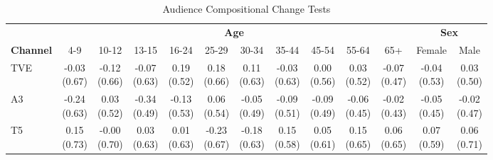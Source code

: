 \documentclass[12pt]{article}
\begin{document}
\begin{table}[!htbp]\centering
\footnotesize
\caption{Audience Compositional Change Tests}
\label{tab:compositional}
\begin{threeparttable}
	\begin{tabular}{lcccccccccc|cc}
		\toprule
		& \multicolumn{10}{c}{\textbf{Age}} & \multicolumn{2}{c}{\textbf{Sex}} \\
		\cmidrule(lr){2-11}\cmidrule(lr){12-13}
		\textbf{Channel} & 4-9 & 10-12 & 13-15 & 16-24 & 25-29 & 30-34 & 35-44 & 45-54 & 55-64 & 65+ & Female & Male \\
		\midrule
		TVE & \shortstack{-0.03\\(0.67)} & \shortstack{-0.12\\(0.66)} & \shortstack{-0.07\\(0.63)} & \shortstack{0.19\\(0.52)} & \shortstack{0.18\\(0.66)} & \shortstack{0.11\\(0.63)} & \shortstack{-0.03\\(0.63)} & \shortstack{0.00\\(0.56)} & \shortstack{0.03\\(0.52)} & \shortstack{-0.07\\(0.47)} & \shortstack{-0.04\\(0.53)} & \shortstack{0.03\\(0.50)} \\
		A3 & \shortstack{-0.24\\(0.63)} & \shortstack{0.03\\(0.52)} & \shortstack{-0.34\\(0.49)} & \shortstack{-0.13\\(0.53)} & \shortstack{0.06\\(0.54)} & \shortstack{-0.05\\(0.49)} & \shortstack{-0.09\\(0.51)} & \shortstack{-0.09\\(0.49)} & \shortstack{-0.06\\(0.45)} & \shortstack{-0.02\\(0.43)} & \shortstack{-0.05\\(0.45)} & \shortstack{-0.02\\(0.47)} \\
		T5 & \shortstack{0.15\\(0.73)} & \shortstack{-0.00\\(0.70)} & \shortstack{0.03\\(0.63)} & \shortstack{0.01\\(0.63)} & \shortstack{-0.23\\(0.67)} & \shortstack{-0.18\\(0.63)} & \shortstack{0.15\\(0.58)} & \shortstack{0.05\\(0.61)} & \shortstack{0.15\\(0.65)} & \shortstack{0.06\\(0.65)} & \shortstack{0.07\\(0.59)} & \shortstack{0.06\\(0.71)} \\

\end{tabular}
\end{threeparttable}
\end{table}
\end{document}
